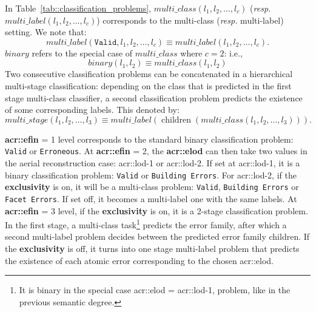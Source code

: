         In Table~\ref{tab::classification_problems}, $multi\_class(l_1, l_2, \dots, l_c)$ (\textit{resp.} $multi\_label(l_1, l_2, \dots, l_c)$) corresponds to the multi-class (\textit{resp.} multi-label) setting.
        We note that:
        \begin{equation*}
            multi\_label(\texttt{Valid}, l_1, l_2, \dots, l_c) \equiv multi\_label(l_1, l_2, \dots, l_c).
        \end{equation*}
        $binary$ refers to the special case of $multi\_class$ where $c = 2$: i.e.,
        \begin{equation*}
            binary(l_1, l_2) \equiv multi\_class(l_1, l_2)
        \end{equation*}
        Two consecutive classification problems can be concatenated in a hierarchical multi-stage classification:
        depending on the class that is predicted in the first stage multi-class classifier, a second classification problem predicts the existence of some corresponding labels.
        This denoted by:
        \begin{equation*}
            multi\_stage(l_1, l_2, \dots, l_3) \equiv multi\_label(\operatorname{children}(multi\_class(l_1, l_2, \dots, l_3))).
        \end{equation*}
            
        \textbf{\gls{acr::efin}} = 1 level corresponds to the standard binary classification problem: \texttt{Valid} or \texttt{Erroneous}.
        At \textbf{\gls{acr::efin}} = 2, the \textbf{\gls{acr::elod}} can then take two values in the aerial reconstruction case: \gls{acr::lod}-1 or \gls{acr::lod}-2.
        If set at \gls{acr::lod}-1, it is a binary classification problem: \texttt{Valid} or \texttt{Building Errors}.
        For \gls{acr::lod}-2, if the \textbf{exclusivity} is on, it will be a multi-class problem: \texttt{Valid}, \texttt{Building Errors} or \texttt{Facet Errors}.
        If set off, it becomes a multi-label one with the same labels.
        At \textbf{\gls{acr::efin}} = 3 level, if the \textbf{exclusivity} is on, it is a 2-stage classification problem.
        In the first stage, a multi-class task\footnote{It is binary in the special case \gls{acr::elod} = \gls{acr::lod}-1, problem, like in the previous semantic degree.}
        predicts the error family, after which a second multi-label problem decides between the predicted error family children.
        If the \textbf{exclusivity} is off, it turns into one stage multi-label problem that predicts the existence of each atomic error corresponding to the chosen \gls{acr::elod}.
    
